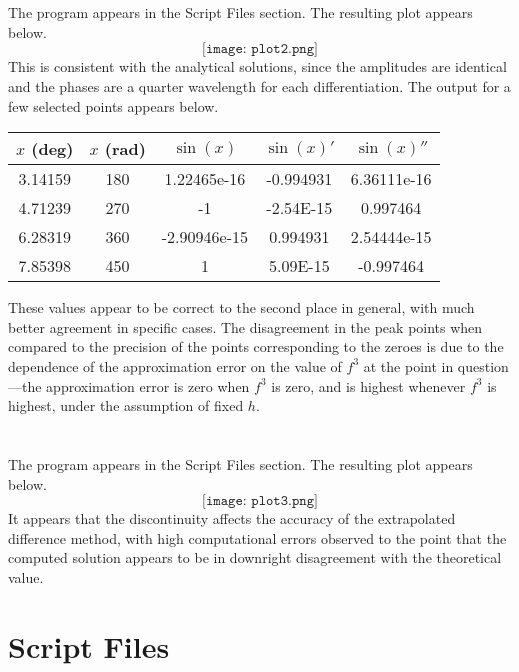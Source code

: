 \documentclass{article}
\begin{document}
\section{}
The program appears in the Script Files section. The resulting plot appears below.
\[\texttt{[image: plot2.png]}\]
This is consistent with the analytical solutions, since the amplitudes are identical and the phases are a quarter wavelength for each differentiation.
The output for a few selected points appears below.
\begin{center}
  \begin{tabular}{ |c|c|c|c|c| }
    \hline
    $x$ (deg) & $x$ (rad) & $\sin(x)$ & $\sin(x)'$ & $\sin(x)''$ \\
    \hline \hline
    3.14159 & 180 & 1.22465e-16 & -0.994931 & 6.36111e-16 \\
    \hline
    4.71239&	270&	-1&	-2.54E-15&	0.997464\\
    \hline
    6.28319 & 360 & -2.90946e-15 & 0.994931 & 2.54444e-15 \\
    \hline
    7.85398&	450&	1&	5.09E-15&	-0.997464\\
    \hline

    
  \end{tabular}
\end{center}
These values appear to be correct to the second place in general, with much better agreement in specific cases. 
The disagreement in the peak points when compared to the precision of the points corresponding to the zeroes is due to the dependence of the approximation error on the value of $f^3$ at the point in question---the approximation error is zero when $f^3$ is zero, and is highest whenever $f^3$ is highest, under the assumption of fixed $h$. 
\section{}
The program appears in the Script Files section. The resulting plot appears below.
\[\texttt{[image: plot3.png]}\]
It appears that the discontinuity affects the accuracy of the extrapolated difference method, with high computational errors observed to the point that the computed solution appears to be in downright disagreement with the theoretical value.
\section*{Script Files}
\end{document}
